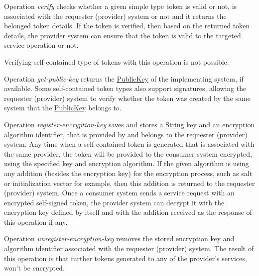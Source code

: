 \documentclass[a4paper]{arrowhead}
\newcommand{\pref}[1]{{\textcolor{ArrowheadGrey}{\hyperref[sec:model:primitives:#1]{#1}}}}
\begin{document}

Operation \textit{verify} checks whether a given simple type token is valid or not, is associated with the requester (provider) system or not and it returns the belonged token details. If the token is verified, then based on the returned token details, the provider system can ensure that the token is valid to the targeted service-operation or not.

Verifying self-contained type of tokens with this operation is not possible.


Operation \textit{get-public-key} returns the \pref{PublicKey} of the implementing system, if available. Some self-contained token types also support signatures, allowing the requester (provider) system to verify whether the token was created by the same system that the \pref{PublicKey} belongs to.


Operation \textit{register-encryption-key} saves and stores a \pref{String} key and an encryption algorithm identifier, that is provided by and belongs to the requester (provider) system. Any time when a self-contained token is generated that is associated with the same provider, the token will be provided to the consumer system encrypted, using the specified key and encryption algorithm. If the given algorithm is using any addition (besides the encryption key) for the encryption process, such as salt or initialization vector for example, then this addition is returned to the requester (provider) system. Once a consumer system sends a service request with an encrypted self-signed token, the provider system can decrypt it with the encryption key defined by itself and with the addition received as the response of this operation if any.


Operation \textit{unregister-encryption-key} removes the stored encryption key and algorithm identifier associated with the requester (provider) system. The result of this operation is that further tokens generated to any of the provider's services, won't be encrypted. 
\end{document}
